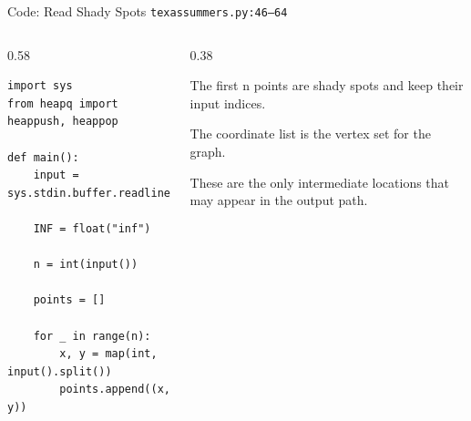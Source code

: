 \documentclass[aspectratio=169,11pt]{beamer}
\begin{document}
\begin{frame}[fragile]{Code: Read Shady Spots}
\scriptsize
{} \texttt{texassummers.py:46--64}

\vspace{0.08cm}
\begin{columns}[T,totalwidth=\textwidth]
\begin{column}{0.58\textwidth}
\begin{lstlisting}[style=cpcode]
import sys
from heapq import heappush, heappop

def main():
    input = sys.stdin.buffer.readline

    INF = float("inf")

    n = int(input())

    points = []

    for _ in range(n):
        x, y = map(int, input().split())
        points.append((x, y))
\end{lstlisting}
\end{column}
\begin{column}{0.38\textwidth}
\begin{tightitemize}
  \item The first n points are shady spots and keep their input indices.
  \item The coordinate list is the vertex set for the graph.
  \item These are the only intermediate locations that may appear in the output path.
\end{tightitemize}
\end{column}
\end{columns}
\end{frame}
\end{document}
